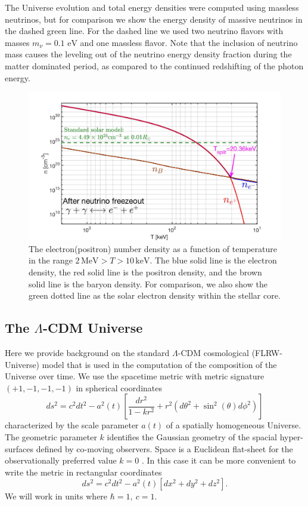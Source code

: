 \documentclass[universe,article,submit,moreauthors,pdftex,a4paper]{Definitions/mdpi}
\newcommand{\eV}{\text{ eV}}
\newcommand{\beqn}{\begin{equation}}
\newcommand{\eeqn}{\end{equation}}
\begin{document}
The Universe evolution and total energy densities were computed using massless neutrinos, but  for comparison we show the energy density of massive neutrinos in the dashed green line. For the dashed line we used two neutrino flavors with masses $m_\nu=0.1\eV$ and one massless flavor.  Note that the inclusion of neutrino mass causes the leveling out of the neutrino energy density fraction during the matter dominated period, as compared to the continued redshifting of the photon energy.

\begin{figure}[h]
  \centering
  \includegraphics[width=\linewidth]{./plots/NewDensity_cm3.jpg}
  \caption{The electron(positron) number density as a function of temperature in the range $2\,\mathrm{MeV}>T>10\,\mathrm{keV}$. The blue solid line is the electron density, the red solid line is the positron density, and the brown solid line is the baryon density. For comparison, we also show the green dotted line as the solar electron density within the stellar core.}
  \label{Density_fig} 
\end{figure}

\subsection{The $\Lambda$-CDM Universe}\label{sec:Cosmo}
\noindent Here we provide background on the standard $\Lambda$-CDM cosmological (FLRW-Universe) model that is used in the computation of the composition of the Universe over time. We use the spacetime metric with metric signature $(+1,-1,-1,-1)$ in spherical coordinates
\beqn\label{metric}
ds^2=c^2dt^2-a^2(t)\left[ \frac{dr^2}{1-kr^2}+r^2(d\theta^2+\sin^2(\theta)d\phi^2)\right]
\eeqn
characterized  by the scale parameter $a(t)$  of a spatially homogeneous  Universe. The geometric parameter $k$ identifies the Gaussian geometry of the spacial hyper-surfaces defined by co-moving observers. Space is a Euclidean flat-sheet for the observationally preferred value $k=0$ \cite{Planck:2013pxb,Planck:2015fie,Planck:2018vyg}. In this case it can be more convenient to write the metric in rectangular coordinates
\beqn\label{metric2}
ds^2=c^2dt^2-a^2(t)\left[ dx^2+dy^2+dz^2\right].
\eeqn
We will work in units where $\hbar=1,\ c=1$.
\end{document}
